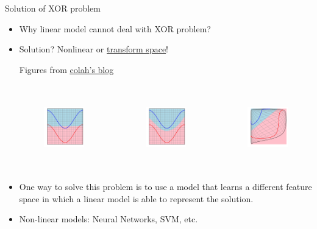 \documentclass[10pt]{beamer}
\begin{document}
	\begin{frame}{Solution of XOR problem}
		\begin{itemize}
			\item Why linear model cannot deal with XOR problem?
			\item Solution? Nonlinear or \href{http://colah.github.io/posts/2014-03-NN-Manifolds-Topology/img/spiral.1-2.2-2-2-2-2-2.gif}{\underline{transform space}}!
			\begin{exampleblock}{Figures from \href{http://colah.github.io/posts/2014-03-NN-Manifolds-Topology/}{\underline{colah's blog}}}
				\begin{columns}[onlytextwidth]
					\begin{figure}
						\includegraphics[height=8em]{figures/nonlinear-separable-1.png}
					\end{figure}
					
					\begin{figure}
						\includegraphics[height=8em]{figures/nonlinear-separable-2.png}
					\end{figure}
					
					\begin{figure}
						\includegraphics[height=8em]{figures/nonlinear-separable-3.png}
					\end{figure}
				\end{columns}
			\end{exampleblock}
			\item One way to solve this problem is to use a model that learns a different feature space in which a linear model is able to represent the solution.
			\item Non-linear models: Neural Networks, SVM, etc.
		\end{itemize}
	\end{frame}
\end{document}
